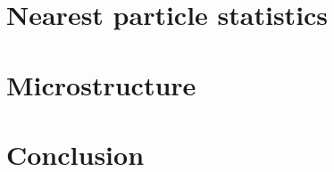 \documentclass[11pt]{My_preprint}
\begin{document}
\section{Nearest particle statistics}
\label{sec:nearest}


\section{Microstructure}
\label{sec:microstructure}



\section{Conclusion}
\label{sec:conclusion}


\appendix







\end{document}
